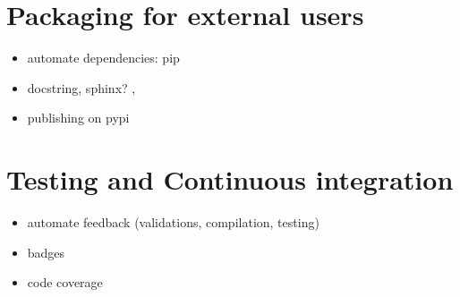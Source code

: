 \documentclass{article}
\begin{document}
\section{Packaging for external users} %
\label{sec:packaging_for_external_users}
	\begin{itemize}
		\item automate dependencies: pip
		\item docstring, sphinx? \hrefSphinx, \hrefReadTheDocs
		\item publishing on pypi \hrefPyPI
	\end{itemize}

\section{Testing and Continuous integration} %
\label{sec:testing_and_continuous_integration}
	\begin{itemize}
		\item automate feedback (validations, compilation, testing) \hrefTravis
		\item badges
		\item code coverage \hrefCoveralls
	\end{itemize}


\clearpage
\citet{Wig67}


\end{document}
